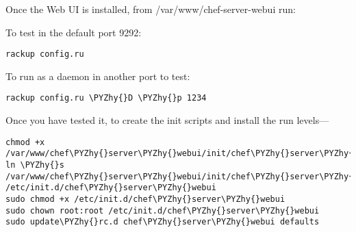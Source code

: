 Once the Web UI is installed, from /var/www/chef-server-webui run:

To test in the default port 9292:
\begin{codelisting}
\label{code:}
\codecaption{}
\begin{Verbatim}[fontsize=\relsize{-2.5},fontseries=b,commandchars=\\\{\}]
rackup config.ru
\end{Verbatim}
\end{codelisting}

To run as a daemon in another port to test:
\begin{codelisting}
\label{code:}
\codecaption{}
\begin{Verbatim}[fontsize=\relsize{-2.5},fontseries=b,commandchars=\\\{\}]
rackup config.ru \PYZhy{}D \PYZhy{}p 1234
\end{Verbatim}
\end{codelisting}

Once you have tested it, to create the init scripts and install the run levels---
\begin{codelisting}
\label{code:}
\codecaption{}
\begin{Verbatim}[fontsize=\relsize{-2.5},fontseries=b,commandchars=\\\{\}]
chmod +x /var/www/chef\PYZhy{}server\PYZhy{}webui/init/chef\PYZhy{}server\PYZhy{}webui.sh
ln \PYZhy{}s /var/www/chef\PYZhy{}server\PYZhy{}webui/init/chef\PYZhy{}server\PYZhy{}webui.sh /etc/init.d/chef\PYZhy{}server\PYZhy{}webui
sudo chmod +x /etc/init.d/chef\PYZhy{}server\PYZhy{}webui
sudo chown root:root /etc/init.d/chef\PYZhy{}server\PYZhy{}webui
sudo update\PYZhy{}rc.d chef\PYZhy{}server\PYZhy{}webui defaults
\end{Verbatim}
\end{codelisting}